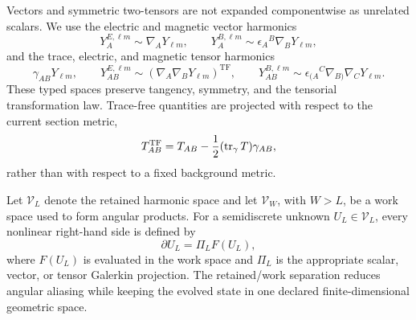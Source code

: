 Vectors and symmetric two-tensors are not expanded componentwise as
unrelated scalars.  We use the electric and magnetic vector harmonics
\[
    Y_A^{E,\ell m}\sim\nabla_A Y_{\ell m},\qquad
    Y_A^{B,\ell m}\sim\epsilon_A{}^B\nabla_B Y_{\ell m},
\]
and the trace, electric, and magnetic tensor harmonics
\[
    \gamma_{AB}Y_{\ell m},\qquad
    Y_{AB}^{E,\ell m}\sim
       \left(\nabla_A\nabla_B Y_{\ell m}\right)^{\mathrm{TF}},
    \qquad
    Y_{AB}^{B,\ell m}\sim
       \epsilon_{(A}{}^C\nabla_{B)}\nabla_CY_{\ell m}.
\]
These typed spaces preserve tangency, symmetry, and the tensorial
transformation law.  Trace-free quantities are projected with respect to the
current section metric,
\[
    T_{AB}^{\mathrm{TF}}
    =T_{AB}-\frac12(\operatorname{tr}_\gamma T)\gamma_{AB},
\]
rather than with respect to a fixed background metric.

Let $\mathcal V_L$ denote the retained harmonic space and let
$\mathcal V_W$, with $W>L$, be a work space used to form angular products.
For a semidiscrete unknown $U_L\in\mathcal V_L$, every nonlinear right-hand
side is defined by
\[
    \partial U_L=\Pi_L F(U_L),
\]
where $F(U_L)$ is evaluated in the work space and $\Pi_L$ is the appropriate
scalar, vector, or tensor Galerkin projection.  The retained/work separation
reduces angular aliasing while keeping the evolved state in one declared
finite-dimensional geometric space.
